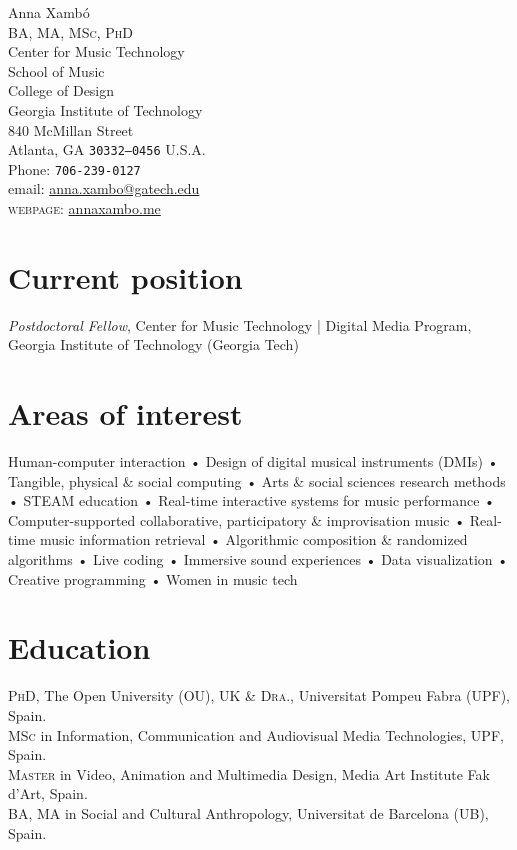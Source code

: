 \documentclass[10pt, a4paper]{article}
\newcommand{\years}[1]{\marginnote{\scriptsize #1}}
\begin{document}
{\Huge Anna Xambó}\\[0.1cm]
\textsc{BA, MA, MSc, PhD}\\[1cm]
Center for Music Technology\\
School of Music\\
College of Design\\
Georgia Institute of Technology\\
840 McMillan Street\\
Atlanta, GA  \texttt{30332--0456}
U.S.A.\\[.2cm]
Phone: \texttt{706-239-0127}\\[.2cm]
email: \href{mailto:anna.xambo@gatech.edu}{anna.xambo@gatech.edu}\\
\textsc{webpage}: \href{http://annaxambo.me/}{annaxambo.me}\\ 

\section*{Current position}
\emph{Postdoctoral Fellow}, Center for Music Technology | Digital Media Program, Georgia Institute of Technology (Georgia Tech)

\section*{Areas of interest}
Human-computer interaction • Design of digital musical instruments (DMIs) • Tangible, physical \& social computing • Arts \& social sciences research methods • STEAM education • Real-time interactive systems for music performance • Computer-supported collaborative, participatory \& improvisation music • Real-time music information retrieval • Algorithmic composition \& randomized algorithms • Live coding • Immersive sound experiences • Data visualization • Creative programming • Women in music tech

\section*{Education}
\noindent
\years{2015}\textsc{PhD}, The Open University (OU), UK \& \textsc{Dra.}, Universitat Pompeu Fabra (UPF), Spain.\\
\years{2008}\textsc{MSc} in Information, Communication and Audiovisual Media Technologies, UPF, Spain.\\
\years{1999}\textsc{Master} in Video, Animation and Multimedia Design, Media Art Institute Fak d'Art, Spain.\\
\years{1996}\textsc{BA, MA} in Social and Cultural Anthropology, Universitat de Barcelona (UB), Spain.
\end{document}
